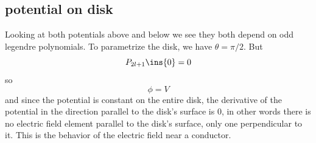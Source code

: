\subsection{potential on disk}
Looking at both potentials above and below we see they both depend on odd legendre polynomials. To parametrize the disk, we have \(\theta=\pi/2\). But 
\begin{equation}
	P_{2l+1}\ins{0}=0
\end{equation}
so 
\begin{equation}
	\phi = V
\end{equation}
and since the potential is constant on the entire disk, the derivative of the potential in the direction parallel to the disk's surface is 0, in other words there is no electric field element parallel to the disk's surface, only one perpendicular to it. This is the behavior of the electric field near a conductor.